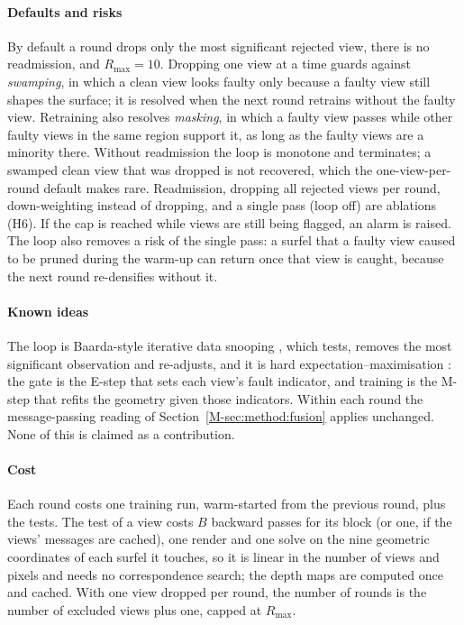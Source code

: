 \paragraph{Defaults and risks}
By default a round drops only the most significant rejected view, there is no readmission, and
$R_{\max}=10$. Dropping one view at a time guards against \emph{swamping}, in which a clean view looks
faulty only because a faulty view still shapes the surface; it is resolved when the next round
retrains without the faulty view. Retraining also resolves \emph{masking}, in which a faulty view
passes while other faulty views in the same region support it, as long as the faulty views are a
minority there. Without readmission the loop is monotone and terminates; a swamped clean view that was
dropped is not recovered, which the one-view-per-round default makes rare. Readmission, dropping all
rejected views per round, down-weighting instead of dropping, and a single pass (loop off) are
ablations (H6). If the cap is reached while views are still being flagged, an alarm is raised. The
loop also removes a risk of the single pass: a surfel that a faulty view caused to be pruned during
the warm-up can return once that view is caught, because the next round re-densifies without it.

\paragraph{Known ideas}
The loop is Baarda-style iterative data snooping \cite{stat_teunissen_dia}, which tests, removes the
most significant observation and re-adjusts, and it is hard expectation--maximisation
\cite{stat_dempster_em}: the gate is the E-step that sets each view's fault indicator, and training is
the M-step that refits the geometry given those indicators. Within each round the message-passing
reading of Section~\ref{M-sec:method:fusion} applies unchanged. None of this is claimed as a contribution.
\paragraph{Cost}
Each round costs one training run, warm-started from the previous round, plus the tests. The test of a
view costs $B$ backward passes for its block (or one, if the views' messages are cached), one render
and one solve on the nine geometric coordinates of each surfel it touches, so it is linear in the number of views and pixels and needs no correspondence search; the
depth maps are computed once and cached. With one view dropped per round, the number of rounds is the
number of excluded views plus one, capped at $R_{\max}$.

